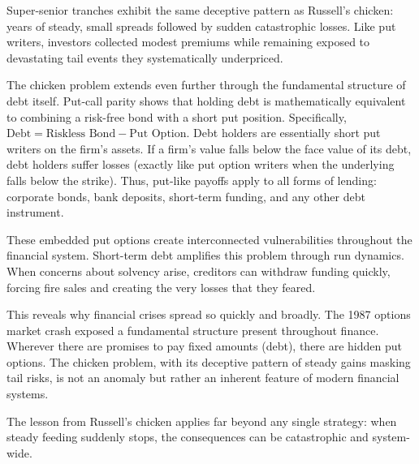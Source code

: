 Super-senior tranches exhibit the same deceptive pattern as Russell’s chicken: years of steady, small spreads followed by sudden catastrophic losses. Like put writers, investors collected modest premiums while remaining exposed to devastating tail events they systematically underpriced. 

The chicken problem extends even further through the fundamental structure of debt itself. Put-call parity shows that holding debt is mathematically equivalent to combining a risk-free bond with a short put position. Specifically, $\text{Debt} = \text{Riskless Bond} - \text{Put Option}$. Debt holders are essentially short put writers on the firm’s assets. If a firm’s value falls below the face value of its debt, debt holders suffer losses (exactly like put option writers when the underlying falls below the strike). Thus, put-like payoffs apply to all forms of lending: corporate bonds, bank deposits, short-term funding, and any other debt instrument. 

These embedded put options create interconnected vulnerabilities throughout the financial system. Short-term debt amplifies this problem through run dynamics. When concerns about solvency arise, creditors can withdraw funding quickly, forcing fire sales and creating the very losses that they feared.

This reveals why financial crises spread so quickly and broadly. The 1987 options market crash exposed a fundamental structure present throughout finance. Wherever there are promises to pay fixed amounts (debt), there are hidden put options. The chicken problem, with its deceptive pattern of steady gains masking tail risks, is not an anomaly but rather an inherent feature of modern financial systems.

The lesson from Russell's chicken applies far beyond any single strategy: when steady feeding suddenly stops, the consequences can be catastrophic and system-wide.